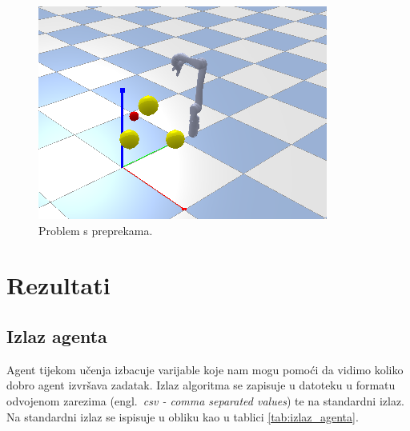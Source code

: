 \documentclass[times,utf8,diplomski]{fer}
\begin{document}
\begin{figure}[ht!]
	\centering
	\includegraphics[width=\columnwidth]{img/spreprekama.png}
	\caption{Problem s preprekama.}
	\label{fig:sprepekama}
\end{figure}


\clearpage
\chapter{Rezultati}
\section{Izlaz agenta}

Agent tijekom učenja izbacuje varijable koje nam mogu pomoći da vidimo koliko dobro agent izvršava zadatak. Izlaz algoritma se zapisuje u datoteku u formatu odvojenom zarezima (engl.~\emph{csv - comma separated values}) te na standardni izlaz. Na standardni izlaz se ispisuje u obliku kao u tablici \ref{tab:izlaz_agenta}.
\end{document}
